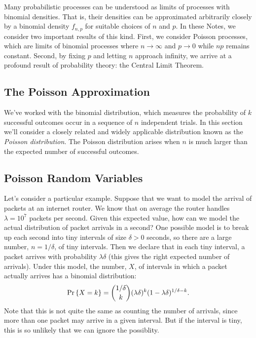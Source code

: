 \documentclass[11pt,twoside]{article}
\begin{document}
\begin{optional}

Many probabilistic processes can be understood as limits of processes with
binomial densities.  That is, their densities can be approximated
arbitrarily closely by a binomial density $f_{n,p}$ for suitable choices
of $n$ and $p$.  In these Notes, we consider two important results of this
kind.  First, we consider Poisson processes, which are limits of binomial
processes where $n \to \infty$ and $p\to 0$ while $np$ remains constant.
Second, by fixing $p$ and letting $n$ approach infinity, we arrive at a
profound result of probability theory: the Central Limit Theorem.


\subsection{The Poisson Approximation}

We've worked with the binomial distribution, which measures the
probability of $k$ successful outcomes occur in a sequence of $n$
independent trials.  In this section we'll consider a closely related and
widely applicable distribution known as the \emph{Poisson distribution}.
The Poisson distribution arises when $n$ is much larger than the expected
number of successful outcomes.

\subsection{Poisson Random Variables}
Let's consider a particular example.  Suppose that we want to model the
arrival of packets at an internet router.  We know that on average the
router handles $\lambda=10^7$ packets per second.  Given this expected
value, how can we model the actual distribution of packet arrivals in a
second?  One possible model is to break up each second into tiny intervals
of size $\delta>0$ seconds, so there are a large number, $n = 1/\delta$,
of tiny intervals.  Then we declare that in each tiny interval, a packet
arrives with probability $\lambda\delta$ (this gives the right expected
number of arrivals).  Under this model, the number, $X$, of intervals in
which a packet actually arrives has a binomial distribution:
\begin{equation}\label{pXk}
\mathop{\textup{Pr}}\nolimits\left\{X=k\right\} =
\binom{1/\delta}{k}(\lambda\delta)^k(1 - \lambda\delta)^{1/\delta-k}.
\end{equation}
Note that this is not quite the same as counting the number of arrivals,
since more than one packet may arrive in a given interval.  But if the
interval is tiny, this is so unlikely that we can ignore the possiblity.


\end{optional}
\end{document}
